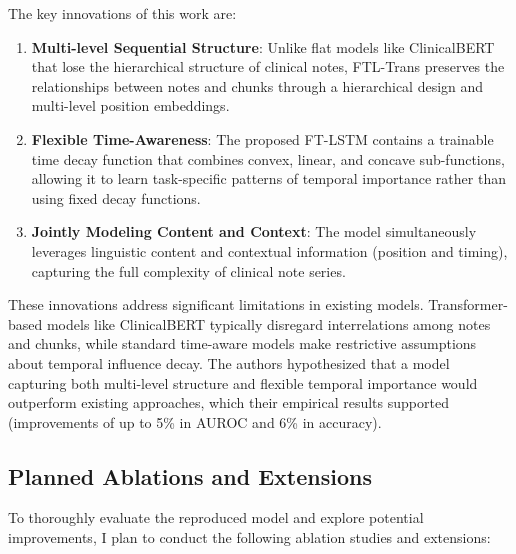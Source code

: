\documentclass[10pt,letterpaper,twocolumn]{article}
\begin{document}
The key innovations of this work are:

\begin{enumerate}[leftmargin=*]
    \item \textbf{Multi-level Sequential Structure}: Unlike flat models like ClinicalBERT that lose the hierarchical structure of clinical notes, FTL-Trans preserves the relationships between notes and chunks through a hierarchical design and multi-level position embeddings.
    
    \item \textbf{Flexible Time-Awareness}: The proposed FT-LSTM contains a trainable time decay function that combines convex, linear, and concave sub-functions, allowing it to learn task-specific patterns of temporal importance rather than using fixed decay functions.
    
    \item \textbf{Jointly Modeling Content and Context}: The model simultaneously leverages linguistic content and contextual information (position and timing), capturing the full complexity of clinical note series.
\end{enumerate}

These innovations address significant limitations in existing models. Transformer-based models like ClinicalBERT typically disregard interrelations among notes and chunks, while standard time-aware models make restrictive assumptions about temporal influence decay. The authors hypothesized that a model capturing both multi-level structure and flexible temporal importance would outperform existing approaches, which their empirical results supported (improvements of up to 5\% in AUROC and 6\% in accuracy).

\subsection{Planned Ablations and Extensions}

To thoroughly evaluate the reproduced model and explore potential improvements, I plan to conduct the following ablation studies and extensions:
\end{document}
